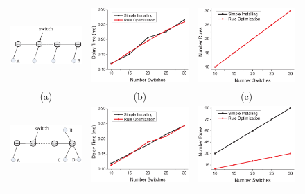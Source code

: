 \begin{figure} [t]
\begin{center}
\scalebox{0.9}
{
\begin{tabular}{ccc}
\includegraphics[width=0.33\columnwidth]{figures/fig-e-31-a.eps}&
\includegraphics[width=0.33\columnwidth]{figures/fig-e-1-24.eps}&\hspace{-0.1\columnwidth}
\includegraphics[width=0.33\columnwidth]{figures/fig-e-2-24.eps} \\
(a) & (b) & (c)
\\
\includegraphics[width=0.33\columnwidth]{figures/fig-e-31-d.eps}&
\includegraphics[width=0.33\columnwidth]{figures/fig-e-3-24.eps}&\hspace{-0.1\columnwidth}
\includegraphics[width=0.33\columnwidth]{figures/fig-e-4-24.eps} \\

\end{tabular}}
\end{center}
\end{figure}
